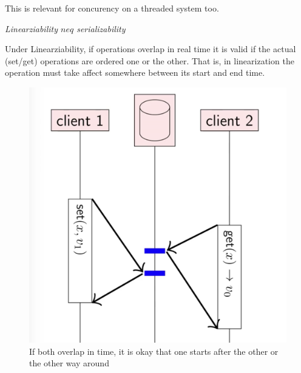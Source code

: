 This is relevant for concurency on a threaded system too.

\emph{Linearziability $neq$ serializability}


Under Linearziability, if operations overlap in real time 
it is valid if the actual (set/get) operations are ordered one or the other.
That is, in linearization the operation must take affect somewhere between
its start and end time.
 
 \begin{figure}[t]
        \centering
        \includegraphics[scale=0.25]{computer-sceince/distributed-media/linearization.png}
        \caption{ If both overlap in time, it is okay that one starts after the other or the other way around
        }
\end{figure}


